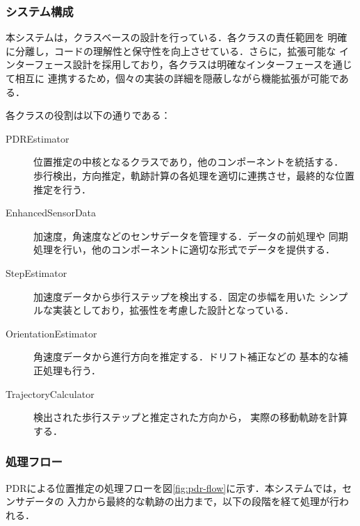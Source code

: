 \subsubsection{システム構成}

本システムは，クラスベースの設計を行っている．各クラスの責任範囲を
明確に分離し，コードの理解性と保守性を向上させている．さらに，拡張可能な
インターフェース設計を採用しており，各クラスは明確なインターフェースを通じて相互に
連携するため，個々の実装の詳細を隠蔽しながら機能拡張が可能である．

各クラスの役割は以下の通りである：

\begin{description}
    \item[PDREstimator]\hfill 位置推定の中核となるクラスであり，他のコンポーネントを統括する．
    歩行検出，方向推定，軌跡計算の各処理を適切に連携させ，最終的な位置推定を行う．
    
    \item[EnhancedSensorData] 加速度，角速度などのセンサデータを管理する．データの前処理や
    同期処理を行い，他のコンポーネントに適切な形式でデータを提供する．
    
    \item[StepEstimator] 加速度データから歩行ステップを検出する．固定の歩幅を用いた
    シンプルな実装としており，拡張性を考慮した設計となっている．
    
    \item[OrientationEstimator] 角速度データから進行方向を推定する．ドリフト補正などの
    基本的な補正処理も行う．
    
    \item[TrajectoryCalculator] 検出された歩行ステップと推定された方向から，
    実際の移動軌跡を計算する．

\end{description}


\subsubsection{処理フロー}

PDRによる位置推定の処理フローを図\ref{fig:pdr-flow}に示す．本システムでは，センサデータの
入力から最終的な軌跡の出力まで，以下の段階を経て処理が行われる．

